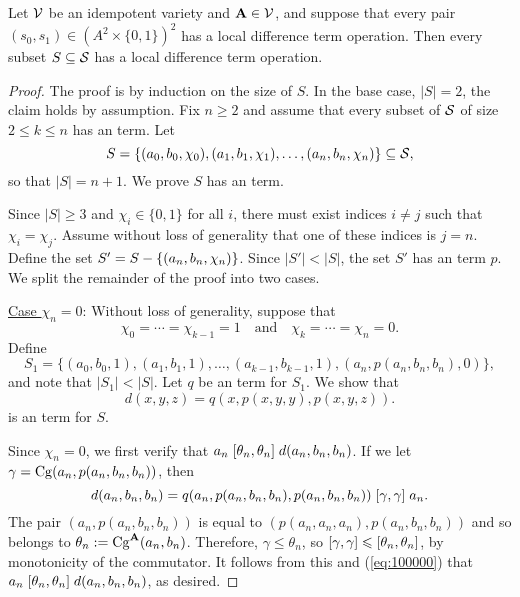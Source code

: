 \begin{theorem} %
  \label{thm:local-diff-terms}
  Let $\mathcal{V}$ be an idempotent variety and
  $\mathbf{A}  \in \mathcal{V}$, %
  and suppose that every pair
  $(s_0, s_1) \in (A^2 \times \{0,1\})^2$
  has a local difference term operation.
  Then every subset $S \subseteq \mathcal{S}$
  has a local difference term operation.
\end{theorem}

\begin{proof}

The proof is by induction on the size of $S$.  In the base case, $|S| = 2$,
the claim holds by assumption.
Fix $n\geq 2$ and assume that every subset of $\mathcal{S}$ of size $2\leq k \leq n$
has an \ld term. Let
\[
S = \{(a_0, b_0, \chi_0), (a_1, b_1, \chi_1), \dots, 
        (a_{n}, b_{n},\chi_{n})\} \subseteq \mathcal{S},
\]
so that $|S| = n+1$.  We prove $S$ has an \ld term.

Since $|S| \geq 3$ and $\chi_i \in \{0,1\}$ for all $i$, there must exist
indices $i\neq j$ such that $\chi_i = \chi_j$. Assume without loss of
generality that one of these indices is $j=n$.  
Define the set $S' = S - \{(a_n, b_n, \chi_n)\}$.
Since $|S'| < |S|$, the set $S'$ has an \ld term $p$.
We split the remainder of the proof into two cases.

\medskip

\noindent \underline{Case $\chi_n = 0$}:
Without loss of generality, suppose that 
\begin{equation*}
  \chi_0 = %
\cdots =\chi_{k-1} = 1 \quad \text{and} \quad
\chi_{k} = \cdots = \chi_{n} = 0.
\end{equation*} 
Define %
\[S_1 = \{(a_0, b_0, 1), (a_1, b_1, 1),
\dots, (a_{k-1}, b_{k-1}, 1), (a_n, p(a_n, b_n, b_n), 0)\},\] and
note that $|S_1| < |S|$.
Let $q$ be an \ld term for $S_1$.
We show that 
\[
d(x,y,z) = q(x, p(x,y,y), p(x,y,z)).
\]
is an \ld term for $S$.

Since $\chi_n =0$, we first verify that
$a_n \mathrel{[\theta_n, \theta_n]} d(a_n,b_n,b_n)$.
If we let $\gamma = \operatorname{Cg}(a_n, p(a_n,b_n,b_n))$, then
\begin{equation}
    \label{eq:100000}
  d(a_n,b_n,b_n) =
  q(a_n, p(a_n,b_n,b_n), p(a_n,b_n,b_n))\mathrel{[\gamma, \gamma]} a_n.
\end{equation}
The pair $(a_n, p(a_n,b_n,b_n))$ is equal to
$(p(a_n,a_n,a_n), p(a_n,b_n,b_n))$ and so 
belongs to $\theta_n:= \operatorname{Cg}^{\mathbf{A}}(a_n, b_n)$.
Therefore, $\gamma\leq \theta_n$, so
$[\gamma, \gamma] \leqslant [\theta_n, \theta_n]$,
by monotonicity of the commutator.
It follows from this and (\ref{eq:100000}) that
$a_n \mathrel{[\theta_n, \theta_n]} d(a_n,b_n,b_n)$, as desired.


\end{proof}
